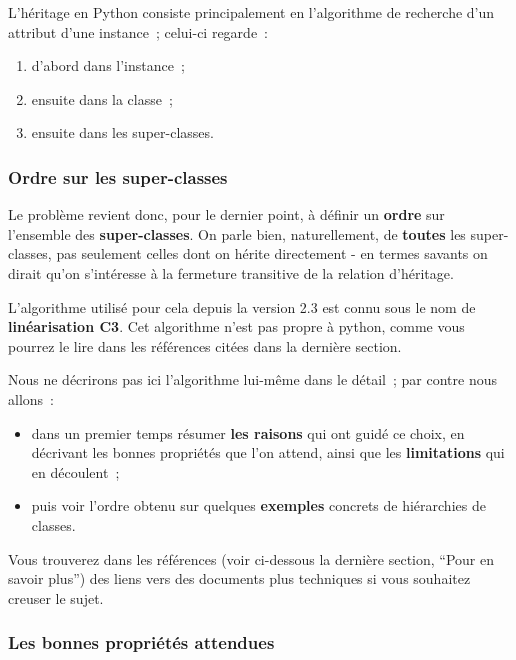    L'héritage en Python consiste principalement en l'algorithme de
recherche d'un attribut d'une instance~; celui-ci regarde~:

\begin{enumerate}
\def\labelenumi{\arabic{enumi}.}
\tightlist
\item
  d'abord dans l'instance~;
\item
  ensuite dans la classe~;
\item
  ensuite dans les super-classes.
\end{enumerate}

    \hypertarget{ordre-sur-les-super-classes}{%
\subsubsection{Ordre sur les
super-classes}\label{ordre-sur-les-super-classes}}

    Le problème revient donc, pour le dernier point, à définir un
\textbf{ordre} sur l'ensemble des \textbf{super-classes}. On parle bien,
naturellement, de \textbf{toutes} les super-classes, pas seulement
celles dont on hérite directement - en termes savants on dirait qu'on
s'intéresse à la fermeture transitive de la relation d'héritage.

L'algorithme utilisé pour cela depuis la version 2.3 est connu sous le
nom de \textbf{linéarisation C3}. Cet algorithme n'est pas propre à
python, comme vous pourrez le lire dans les références citées dans la
dernière section.

Nous ne décrirons pas ici l'algorithme lui-même dans le détail~; par
contre nous allons~:

\begin{itemize}
\tightlist
\item
  dans un premier temps résumer \textbf{les raisons} qui ont guidé ce
  choix, en décrivant les bonnes propriétés que l'on attend, ainsi que
  les \textbf{limitations} qui en découlent~;
\item
  puis voir l'ordre obtenu sur quelques \textbf{exemples} concrets de
  hiérarchies de classes.
\end{itemize}

Vous trouverez dans les références (voir ci-dessous la dernière section,
``Pour en savoir plus'') des liens vers des documents plus techniques si
vous souhaitez creuser le sujet.

    \hypertarget{les-bonnes-propriuxe9tuxe9s-attendues}{%
\subsubsection{Les bonnes propriétés
attendues}\label{les-bonnes-propriuxe9tuxe9s-attendues}}

